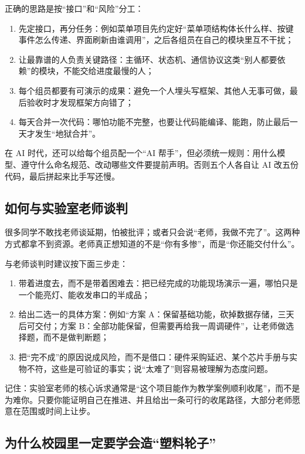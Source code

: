 正确的思路是按“接口”和“风险”分工：

\begin{enumerate}
\item 先定接口，再分任务：例如菜单项目先约定好“菜单项结构体长什么样、按键事件怎么传递、界面刷新由谁调用”，之后各组员在自己的模块里互不干扰；
\item 让最靠谱的人负责关键路径：主循环、状态机、通信协议这类“别人都要依赖”的模块，不能交给进度最慢的人；
\item 每个组员都要有可演示的成果：避免一个人埋头写框架、其他人无事可做，最后验收时才发现框架方向错了；
\item 每天合并一次代码：哪怕功能不完整，也要让代码能编译、能跑，防止最后一天才发生“地狱合并”。
\end{enumerate}

在 AI 时代，还可以给每个组员配一个“AI 帮手”，但必须统一规则：用什么模型、遵守什么命名规范、改动哪些文件要提前声明。否则五个人各自让 AI 改五份代码，最后拼起来比手写还慢。

\subsection{如何与实验室老师谈判}

很多同学不敢找老师谈延期，怕被批评；或者只会说“老师，我做不完了”。这两种方式都拿不到资源。老师真正想知道的不是“你有多惨”，而是“你还能交付什么”。

与老师谈判时建议按下面三步走：

\begin{enumerate}
\item 带着进度去，而不是带着困难去：把已经完成的功能现场演示一遍，哪怕只是一个能亮灯、能收发串口的半成品；
\item 给出二选一的具体方案：例如“方案 A：保留基础功能，砍掉数据存储，三天后可交付；方案 B：全部功能保留，但需要再给我一周调硬件”，让老师做选择题，而不是做判断题；
\item 把“完不成”的原因说成风险，而不是借口：硬件采购延迟、某个芯片手册与实物不符，这些是可验证的事实；说“太难了”则容易被理解为态度问题。
\end{enumerate}

记住：实验室老师的核心诉求通常是“这个项目能作为教学案例顺利收尾”，而不是为难你。只要你能证明自己在推进、并且给出一条可行的收尾路径，大部分老师愿意在范围或时间上让步。

\subsection{为什么校园里一定要学会造“塑料轮子”}

